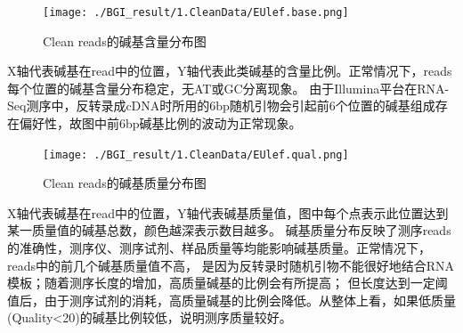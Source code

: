 \documentclass[10pt, oneside,a4paper]{article}
\begin{document}
\begin{figure}[H]
\centering
\texttt{[image: ./BGI\_result/1.CleanData/EUlef.base.png]}
\renewcommand{\figurename}{图}
\caption{Clean reads的碱基含量分布图}
\label{ReadsBase}
\end{figure}
X轴代表碱基在read中的位置，Y轴代表此类碱基的含量比例。正常情况下，reads每个位置的碱基含量分布稳定，无AT或GC分离现象。
由于Illumina平台在RNA-Seq测序中，反转录成cDNA时所用的6bp随机引物会引起前6个位置的碱基组成存在偏好性，故图中前6bp碱基比例的波动为正常现象。

\begin{figure}[H]
\centering
\texttt{[image: ./BGI\_result/1.CleanData/EUlef.qual.png]}
\renewcommand{\figurename}{图}
\caption{Clean reads的碱基质量分布图}
\label{ReadsHeatmap}
\end{figure}
X轴代表碱基在read中的位置，Y轴代表碱基质量值，图中每个点表示此位置达到某一质量值的碱基总数，颜色越深表示数目越多。
碱基质量分布反映了测序reads的准确性，测序仪、测序试剂、样品质量等均能影响碱基质量。正常情况下，reads中的前几个碱基质量值不高，
是因为反转录时随机引物不能很好地结合RNA模板；随着测序长度的增加，高质量碱基的比例会有所提高；
但长度达到一定阈值后，由于测序试剂的消耗，高质量碱基的比例会降低。从整体上看，如果低质量(Quality<20)的碱基比例较低，说明测序质量较好。
\vspace{5 mm}
\end{document}
